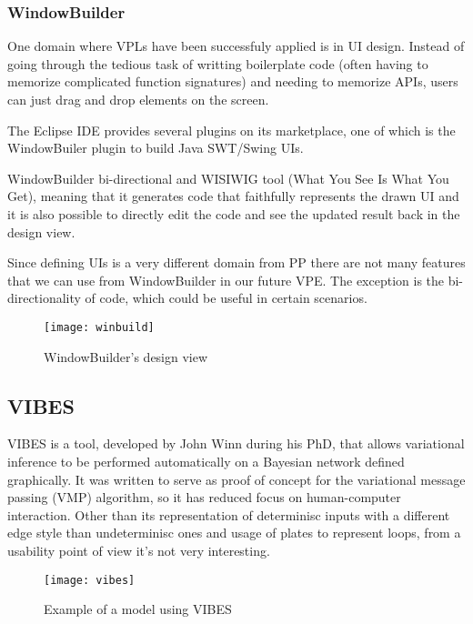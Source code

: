 \begin{itemsize}
\subsubsection{WindowBuilder}

One domain where VPLs have been successfuly applied is in UI design. Instead of
going through the tedious task of writting boilerplate code (often having to
memorize complicated function signatures) and needing to memorize APIs, users
can just drag and drop elements on the screen.

The Eclipse IDE provides several plugins on its marketplace, one of which is the
WindowBuiler plugin \cite{winbuild} to build Java SWT/Swing UIs.

WindowBuilder bi-directional and WISIWIG tool (What You See Is What You Get), meaning
that it generates code that faithfully represents the drawn UI and it is also possible to
directly edit the code and see the updated result back in the design view.

Since defining UIs is a very different domain from PP there are not many features
that we can use from WindowBuilder in our future VPE. The exception is the
bi-directionality of code, which could be useful in certain scenarios.

\begin{figure}[t]
  \begin{center}
    \leavevmode
    \texttt{[image: winbuild]}
    \caption{WindowBuilder's design view \cite{winbuild}}
    \label{fig:winbuild}
  \end{center}
\end{figure}

\subsection{VIBES}
\label{sec:vibes}

VIBES is a tool, developed by John Winn during his PhD, that allows variational
inference to be performed automatically on a Bayesian network \cite{Winn2005}
defined graphically.
It was written to serve as proof of concept for the variational message passing (VMP)
algorithm, so it has reduced focus on human-computer interaction. Other than its representation
of determinisc inputs with a different edge style than undeterminisc ones and
usage of plates to represent loops, from a usability point of view it's not very interesting.

\begin{figure}[t]
  \begin{center}
    \leavevmode
    \texttt{[image: vibes]}
    \caption{Example of a model using VIBES \cite{Winn2005}}
    \label{fig:vibes}
  \end{center}
\end{figure}


\end{itemsize}
